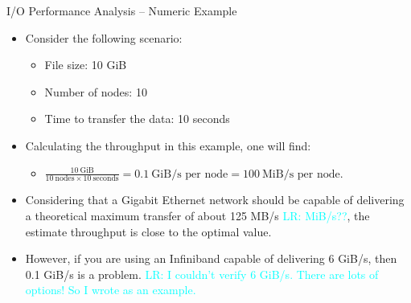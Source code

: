 \documentclass[compress,11pt,xcolor=svgnames,aspectratio=169]{beamer}
\newcommand{\lr}[1]{\textcolor{cyan}{LR: #1}}
\begin{document}
\begin{frame}[fragile]{I/O Performance Analysis -- Numeric Example}

\begin{itemize}
\setlength\itemsep{0.2cm}

  \item Consider the following scenario:

    \begin{itemize}
    \setlength\itemsep{0.1cm}
      \item File size: 10 GiB
      \item Number of nodes: 10
      \item Time to transfer the data: 10 seconds
    \end{itemize}

  \item Calculating the throughput in this example, one will find:\\[0.2cm]

    \begin{itemize}
    \setlength\itemsep{0.2cm}
      \item $\displaystyle \frac{10\ \text{GiB}}{10\ \text{nodes} \times 10\ \text{seconds}} = 0.1\ \text{GiB/s per node} = 100\ \text{MiB/s per node}$.
    \end{itemize}

  \item Considering that a Gigabit Ethernet network should be capable of delivering a theoretical maximum transfer of about 125 MB/s \lr{MiB/s??}, the estimate throughput is close to the optimal value.

  \item However, if you are using an Infiniband capable of delivering 6 GiB/s, then 0.1 GiB/s is a problem.  \lr{I couldn't verify 6 GiB/s. There are lots of options! So I wrote as an example.}

\end{itemize}

\end{frame}
\end{document}
